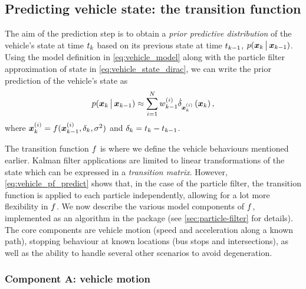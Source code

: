 \subsection{Predicting vehicle state: the transition function}
\label{sec:vehicle_model_trans}

The aim of the prediction step is to obtain a \emph{prior predictive distribution} of the vehicle's state at time $t_k$ based on its previous state at time $t_{k-1}$, $p(\boldsymbol x_k \,\big|\,{} \boldsymbol x_{k-1})$. Using the model definition in \cref{eq:vehicle_model} along with the particle filter approximation of state in \cref{eq:vehicle_state_dirac}, we can write the prior prediction of the vehicle's state as
\begin{equation}
\label{eq:vehicle_pf_predict}
p(\boldsymbol x_k \,\big|\,{} \boldsymbol x_{k-1}) \approx
\sum_{i=1}^N
    w^{(i)}_{k-1}
    \dot\delta_{\boldsymbol x_k^{(i)}}\left(\boldsymbol x_k\right),
\end{equation}
where $\boldsymbol x_k^{(i)} = f(\boldsymbol x^{(i)}_{k-1}, \delta_k, \sigma^2)$ and $\delta_k = t_k - t_{k-1}$.

The transition function $f$ is where we define the vehicle behaviours mentioned earlier. Kalman filter applications are limited to linear transformations of the state which can be expressed in a \emph{transition matrix}. However, \cref{eq:vehicle_pf_predict} shows that, in the case of the particle filter, the transition function is applied to each particle independently, allowing for a lot more flexibility in $f$. We now describe the various model components of $f$, implemented as an algorithm in the  package (see \cref{sec:particle-filter} for details). The core components are vehicle motion (speed and acceleration along a known path), stopping behaviour at known locations (bus stops and intersections), as well as the ability to handle several other scenarios to avoid degeneration.


\subsubsection{Component A: vehicle motion}
\label{sec:vehicle_model_behaviour}

